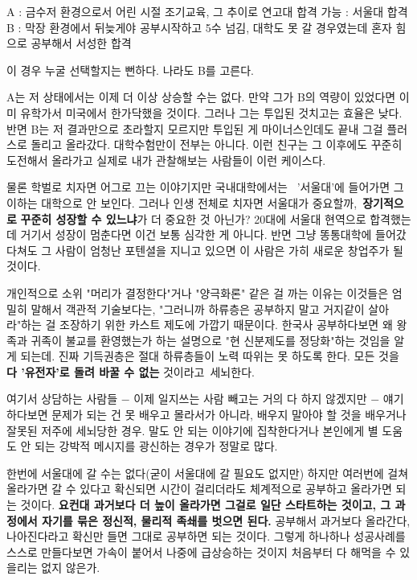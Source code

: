 \vspace{5mm}

A : 금수저 환경으로서 어린 시절 조기교육, 그 추이로 연고대 합격 가능 : 서울대 합격
B : 막장 환경에서 뒤늦게야 공부시작하고 5수 넘김, 대학도 못 갈 경우였는데 혼자 힘으로 공부해서 서성한 합격
\vspace{5mm}

이 경우 누굴 선택할지는 뻔하다. 나라도 B를 고른다.
\vspace{5mm}

A는 저 상태에서는 이제 더 이상 상승할 수는 없다. 만약 그가 B의 역량이 있었다면 이미 유학가서 미국에서 한가닥했을 것이다.
그러나 그는 투입된 것치고는 효율은 낮다.
반면 B는 저 결과만으로 초라할지 모르지만 투입된 게 마이너스인데도 끝내 그걸 플러스로 돌리고 올라갔다.
대학수험만이 전부는 아니다. 이런 친구는 그 이후에도 꾸준히 도전해서 올라가고 실제로 내가 관찰해보는 사람들이 이런 케이스다.
\vspace{5mm}

물론 학벌로 치자면 어그로 끄는 이야기지만 국내대학에서는  '서울대'에 들어가면 그 이하는 대학으로 안 보인다.
그러나 인생 전체로 치자면 서울대가 중요할까, \textbf{장기적으로} \textbf{꾸준히 성장할 수 있느냐}가 더 중요한 것 아닌가?
20대에 서울대 현역으로 합격했는데 거기서 성장이 멈춘다면 이건 보통 심각한 게 아니다.
반면 그냥 똥통대학에 들어갔다쳐도 그 사람이 엄청난 포텐셜을 지니고 있으면 이 사람은 가히 새로운 창업주가 될 것이다.
\vspace{5mm}

개인적으로 소위 "머리가 결정한다"거나 "양극화론" 같은 걸 까는 이유는
이것들은 엄밀히 말해서 객관적 기술보다는, "그러니까 하류층은 공부하지 말고 거지같이 살아라"하는 걸 조장하기 위한
카스트 제도에 가깝기 때문이다.
한국사 공부하다보면 왜 왕족과 귀족이 불교를 환영했는가 하는 설명으로 "현 신분제도를 정당화"하는 것임을 알게 되는데.
진짜 기득권층은 절대 하류층들이 노력 따위는 못 하도록 한다. 모든 것을 \textbf{다 '유전자'로 돌려 바꿀 수 없는} 것이라고 세뇌한다.
\vspace{5mm}

여기서 상담하는 사람들 $-$ 이제 일지쓰는 사람 빼고는 거의 다 하지 않겠지만 $-$
얘기하다보면 문제가 되는 건 못 배우고 몰라서가 아니라, 배우지 말아야 할 것을 배우거나 잘못된 저주에 세뇌당한 경우.
말도 안 되는 이야기에 집착한다거나 본인에게 별 도움도 안 되는 강박적 메시지를 광신하는 경우가 정말로 많다.
\vspace{5mm}

한번에 서울대에 갈 수는 없다(굳이 서울대에 갈 필요도 없지만)
하지만 여러번에 걸쳐 올라가면 갈 수 있다고 확신되면 시간이 걸리더라도 체계적으로 공부하고 올라가면 되는 것이다.
\textbf{요컨대 과거보다 더 높이 올라가면 그걸로 일단 스타트하는 것이고, 그 과정에서 자기를 묶은 정신적, 물리적 족쇄를 벗으면 된다.}
공부해서 과거보다 올라간다, 나아진다라고 확신만 들면 그대로 공부하면 되는 것이다.
그렇게 하나하나 성공사례를 스스로 만들다보면 가속이 붙어서 나중에 급상승하는 것이지
처음부터 다 해먹을 수 있을리는 없지 않은가.
\vspace{5mm}

